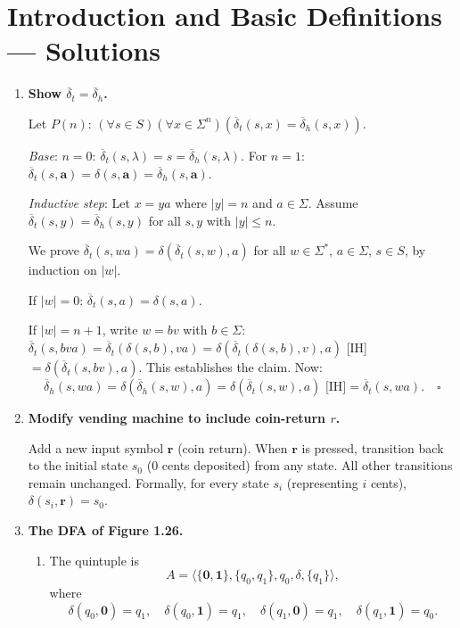 \documentclass[11pt,openany]{book}
\def\DBAR{\ensuremath{\overline{\delta}}}
\begin{document}
\chapter{Introduction and Basic Definitions --- Solutions}

\begin{enumerate}[{1.}1.]

\item \textbf{Show $\DBAR_t = \DBAR_h$.}

Let $P(n)$: $(\forall s\in S)(\forall x\in\Sigma^n)(\DBAR_t(s,x)=\DBAR_h(s,x))$.

\textit{Base}: $n=0$: $\DBAR_t(s,\lambda)=s=\DBAR_h(s,\lambda)$. For $n=1$: $\DBAR_t(s,\mathbf{a})=\delta(s,\mathbf{a})=\DBAR_h(s,\mathbf{a})$.

\textit{Inductive step}: Let $x=ya$ where $|y|=n$ and $a\in\Sigma$. Assume $\DBAR_t(s,y)=\DBAR_h(s,y)$ for all $s,y$ with $|y|\leq n$.

We prove $\DBAR_t(s,wa)=\delta(\DBAR_t(s,w),a)$ for all $w\in\Sigma^*$, $a\in\Sigma$, $s\in S$, by induction on $|w|$.

If $|w|=0$: $\DBAR_t(s,a) = \delta(s,a)$. \checkmark

If $|w|=n+1$, write $w=bv$ with $b\in\Sigma$: $\DBAR_t(s,bva) = \DBAR_t(\delta(s,b),va) = \delta(\DBAR_t(\delta(s,b),v),a)$ [IH] $= \delta(\DBAR_t(s,bv),a)$. This establishes the claim. Now:
\[
\DBAR_h(s,wa) = \delta(\DBAR_h(s,w),a) = \delta(\DBAR_t(s,w),a) \text{ [IH]} = \DBAR_t(s,wa). \quad\square
\]

\item \textbf{Modify vending machine to include coin-return $r$.}

Add a new input symbol $\mathbf{r}$ (coin return). When $\mathbf{r}$ is pressed, transition back to the initial state $s_0$ (0 cents deposited) from any state. All other transitions remain unchanged. Formally, for every state $s_i$ (representing $i$ cents), $\delta(s_i, \mathbf{r}) = s_0$.

\item \textbf{The DFA of Figure 1.26.}

\begin{enumerate}
\item The quintuple is
\[
A=\langle\{\pmb{0},\pmb{1}\},\{q_0,q_1\},q_0,\delta,\{q_1\}\rangle,
\]
where
\[
\delta(q_0,\pmb{0})=q_1,\quad \delta(q_0,\pmb{1})=q_1,\quad
\delta(q_1,\pmb{0})=q_1,\quad \delta(q_1,\pmb{1})=q_0.
\]


\end{enumerate}
\end{enumerate}
\end{document}

